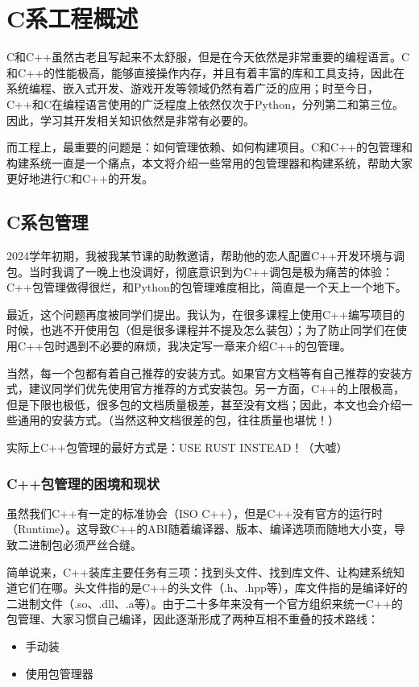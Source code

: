\chapter{C系工程概述}

C和C++虽然古老且写起来不太舒服，但是在今天依然是非常重要的编程语言。C和C++的性能极高，能够直接操作内存，并且有着丰富的库和工具支持，因此在系统编程、嵌入式开发、游戏开发等领域仍然有着广泛的应用；时至今日，C++和C在编程语言使用的广泛程度上依然仅次于Python，分列第二和第三位。因此，学习其开发相关知识依然是非常有必要的。

而工程上，最重要的问题是：如何管理依赖、如何构建项目。C和C++的包管理和构建系统一直是一个痛点，本文将介绍一些常用的包管理器和构建系统，帮助大家更好地进行C和C++的开发。

\section{C系包管理}

2024学年初期，我被我某节课的助教邀请，帮助他的恋人配置C++开发环境与调包。当时我调了一晚上也没调好，彻底意识到为C++调包是极为痛苦的体验：C++包管理做得很烂，和Python的包管理难度相比，简直是一个天上一个地下。

最近，这个问题再度被同学们提出。我认为，在很多课程上使用C++编写项目的时候，也逃不开使用包（但是很多课程并不提及怎么装包）；为了防止同学们在使用C++包时遇到不必要的麻烦，我决定写一章来介绍C++的包管理。

当然，每一个包都有着自己推荐的安装方式。如果官方文档等有自己推荐的安装方式，建议同学们优先使用官方推荐的方式安装包。另一方面，C++的上限极高，但是下限也极低，很多包的文档质量极差，甚至没有文档；因此，本文也会介绍一些通用的安装方式。（当然这种文档很差的包，往往质量也堪忧！）

实际上C++包管理的最好方式是：USE RUST INSTEAD！（大嘘）

\subsection{C++包管理的困境和现状}

虽然我们C++有一定的标准协会（ISO C++），但是C++没有官方的运行时（Runtime）。这导致C++的ABI随着编译器、版本、编译选项而随地大小变，导致二进制包必须严丝合缝。

简单说来，C++装库主要任务有三项：找到头文件、找到库文件、让构建系统知道它们在哪。头文件指的是C++的头文件（.h、.hpp等），库文件指的是编译好的二进制文件（.so、.dll、.a等）。由于二十多年来没有一个官方组织来统一C++的包管理、大家习惯自己编译，因此逐渐形成了两种互相不重叠的技术路线：
\begin{itemize}
  \item 手动装
  \item 使用包管理器
\end{itemize}


